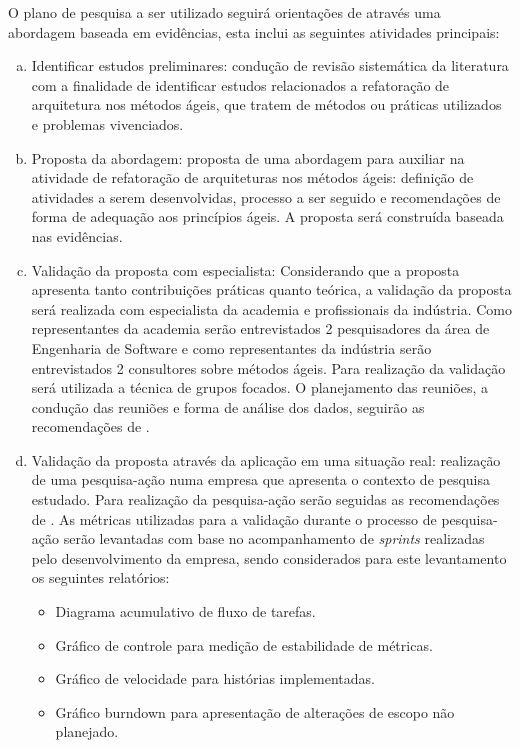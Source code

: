 O plano de pesquisa a ser utilizado seguirá orientações de \cite{dias2010developing} através uma abordagem baseada em evidências, esta inclui as seguintes atividades principais:
\begin{enumerate}[(a)]

\item Identificar estudos preliminares: condução de revisão sistemática da literatura com a finalidade de identificar estudos relacionados a refatoração de arquitetura nos métodos ágeis, que tratem de métodos ou práticas utilizados e problemas vivenciados.

\item Proposta da abordagem: proposta de uma abordagem para auxiliar na atividade de refatoração de arquiteturas nos métodos ágeis: definição de atividades a serem desenvolvidas, processo a ser seguido e recomendações de forma de adequação aos princípios ágeis. A proposta será construída baseada nas evidências.

\item Validação da proposta com especialista: Considerando que a proposta apresenta tanto contribuições práticas quanto teórica, a validação da proposta será realizada com especialista da academia e profissionais da indústria. Como representantes da academia serão entrevistados 2 pesquisadores da área de Engenharia de Software e como representantes da indústria serão entrevistados 2 consultores sobre métodos ágeis. Para realização da validação será utilizada a técnica de grupos focados. O planejamento das reuniões, a condução das reuniões e forma de análise dos dados, seguirão as recomendações de \cite{ribeiro2003gruposfocados}.

\item Validação da proposta através da aplicação em uma situação real: realização de uma pesquisa-ação numa empresa que apresenta o contexto de pesquisa estudado. Para realização da pesquisa-ação serão seguidas as recomendações de \cite{dos2008colaboraccao}. As métricas utilizadas para a validação durante o processo de pesquisa-ação serão levantadas com base no acompanhamento de \textit{sprints} realizadas pelo desenvolvimento da empresa, sendo considerados para este levantamento os seguintes relatórios:
    
   \begin{itemize}
        \item Diagrama acumulativo de fluxo de tarefas.
        \item Gráfico de controle para medição de estabilidade de métricas.
        \item Gráfico de velocidade para histórias implementadas.
        \item Gráfico burndown para apresentação de alterações de escopo não planejado.
    \end{itemize}  
    
\end{enumerate}


